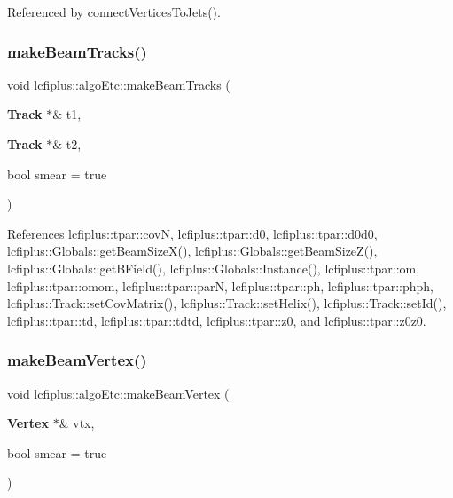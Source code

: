 Referenced by connect\+Vertices\+To\+Jets().

\mbox{\label{namespacelcfiplus_1_1algoEtc_a41719db5de88ab2db9315924620f9ae3}} 
\subsubsection{make\+Beam\+Tracks()}
{\footnotesize\ttfamily void lcfiplus\+::algo\+Etc\+::make\+Beam\+Tracks (\begin{DoxyParamCaption}\item[{\textbf{ Track} $\ast$\&}]{t1,  }\item[{\textbf{ Track} $\ast$\&}]{t2,  }\item[{bool}]{smear = {\ttfamily true} }\end{DoxyParamCaption})}



References lcfiplus\+::tpar\+::covN, lcfiplus\+::tpar\+::d0, lcfiplus\+::tpar\+::d0d0, lcfiplus\+::\+Globals\+::get\+Beam\+Size\+X(), lcfiplus\+::\+Globals\+::get\+Beam\+Size\+Z(), lcfiplus\+::\+Globals\+::get\+B\+Field(), lcfiplus\+::\+Globals\+::\+Instance(), lcfiplus\+::tpar\+::om, lcfiplus\+::tpar\+::omom, lcfiplus\+::tpar\+::parN, lcfiplus\+::tpar\+::ph, lcfiplus\+::tpar\+::phph, lcfiplus\+::\+Track\+::set\+Cov\+Matrix(), lcfiplus\+::\+Track\+::set\+Helix(), lcfiplus\+::\+Track\+::set\+Id(), lcfiplus\+::tpar\+::td, lcfiplus\+::tpar\+::tdtd, lcfiplus\+::tpar\+::z0, and lcfiplus\+::tpar\+::z0z0.

\mbox{\label{namespacelcfiplus_1_1algoEtc_a4a38aaaefd3e8503824ccf9d81237723}} 
\subsubsection{make\+Beam\+Vertex()}
{\footnotesize\ttfamily void lcfiplus\+::algo\+Etc\+::make\+Beam\+Vertex (\begin{DoxyParamCaption}\item[{\textbf{ Vertex} $\ast$\&}]{vtx,  }\item[{bool}]{smear = {\ttfamily true} }\end{DoxyParamCaption})}



